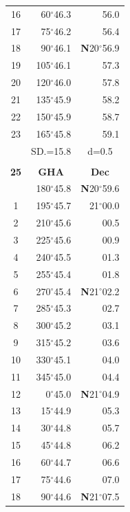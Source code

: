 \documentclass[10pt, a4paper]{report}
\begin{document}
\begin{scriptsize}
\begin{tabular*}{0.2\textwidth}[t]{@{\extracolsep{\fill}}|c|rr|}
16 & 60$^\circ$46.3 & 56.0\\
17 & 75$^\circ$46.2 & 56.4\\[2Pt]
18 & 90$^\circ$46.1 & \textbf{N}20$^\circ$56.9\\
19 & 105$^\circ$46.1 & 57.3\\
20 & 120$^\circ$46.0 & 57.8\\
21 & 135$^\circ$45.9 & \raisebox{0.24ex}{\boldmath$\cdot$~\boldmath$\cdot$~~}58.2\\
22 & 150$^\circ$45.9 & 58.7\\
23 & 165$^\circ$45.8 & 59.1\\
\hline
\rule{0pt}{2.4ex} & \multicolumn{1}{c}{SD.=15.8} & \multicolumn{1}{c|}{d=0.5}\\
\hline
\multicolumn{1}{c}{}\\[-0.5ex]\hline
\multicolumn{1}{|c|}{\rule{0pt}{2.6ex}\textbf{25}} & \multicolumn{1}{c}{\textbf{GHA}} & \multicolumn{1}{c|}{\textbf{Dec}}\\
\hline\rule{0pt}{2.6ex}\noindent
0 & 180$^\circ$45.8 & \textbf{N}20$^\circ$59.6\\
1 & 195$^\circ$45.7 & 21$^\circ$00.0\\
2 & 210$^\circ$45.6 & 00.5\\
3 & 225$^\circ$45.6 & \raisebox{0.24ex}{\boldmath$\cdot$~\boldmath$\cdot$~~}00.9\\
4 & 240$^\circ$45.5 & 01.3\\
5 & 255$^\circ$45.4 & 01.8\\[2Pt]
6 & 270$^\circ$45.4 & \textbf{N}21$^\circ$02.2\\
7 & 285$^\circ$45.3 & 02.7\\
8 & 300$^\circ$45.2 & 03.1\\
9 & 315$^\circ$45.2 & \raisebox{0.24ex}{\boldmath$\cdot$~\boldmath$\cdot$~~}03.6\\
10 & 330$^\circ$45.1 & 04.0\\
11 & 345$^\circ$45.0 & 04.4\\[2Pt]
12 & 0$^\circ$45.0 & \textbf{N}21$^\circ$04.9\\
13 & 15$^\circ$44.9 & 05.3\\
14 & 30$^\circ$44.8 & 05.7\\
15 & 45$^\circ$44.8 & \raisebox{0.24ex}{\boldmath$\cdot$~\boldmath$\cdot$~~}06.2\\
16 & 60$^\circ$44.7 & 06.6\\
17 & 75$^\circ$44.6 & 07.0\\[2Pt]
18 & 90$^\circ$44.6 & \textbf{N}21$^\circ$07.5\\

\end{tabular*}
\end{scriptsize}
\end{document}
